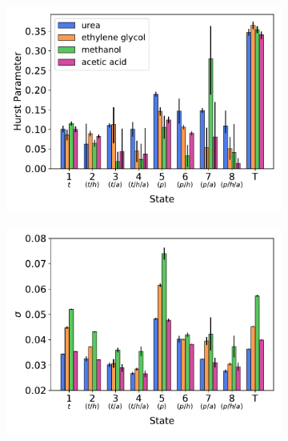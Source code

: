 \documentclass[journal=jctcce,manuscript=article]{achemso}
\begin{document}
  \begin{figure}
  \centering
  \begin{subfigure}{0.325\textwidth}
  \includegraphics[width=\textwidth]{H_v_state.pdf}
  \caption{}\label{fig:H_v_state}
  \end{subfigure}
  \begin{subfigure}{0.325\textwidth}
  \includegraphics[width=\textwidth]{sigma_v_state.pdf}
  \caption{}\label{fig:sigma_v_state}
  \end{subfigure}
  \begin{subfigure}{0.325\textwidth}

\end{subfigure}
\end{figure}
\end{document}
